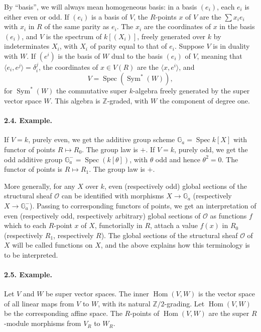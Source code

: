 \documentclass[11pt]{article}
\newcommand{\Z}{\mathbb Z}
\newcommand{\Spec}{\operatorname{Spec}}
\newcommand{\Hom}{\operatorname{Hom}}
\newcommand{\Sym}{\operatorname{Sym}}
\newcommand{\Ga}{\mathbb G_a}
\newcommand{\calO}{\mathcal O}
\begin{document}
By ``basis'', we will always mean homogeneous basis: in a basis $(e_i)$, each $e_i$ is either even or odd. If $(e_i)$ is a basis of $V$, the $R$-points $x$ of $V$ are the $\sum x_i e_i$ with $x_i$ in $R$ of the same parity as $e_i$. The $x_i$ are the coordinates of $x$ in the basis $(e_i)$, and $V$ is the spectrum of $k[(X_i)]$, freely generated over $k$ by indeterminates $X_i$, with $X_i$ of parity equal to that of $e_i$. Suppose $V$ is in duality with $W$. If $(e^i)$ is the basis of $W$ dual to the basis $(e_i)$ of $V$, meaning that $\langle e_i,e^j\rangle=\delta_i^j$, the coordinates of $x\in V(R)$ are the $\langle x,e^i\rangle$, and
\[
V=\Spec(\Sym^*(W)),
\]
for $\Sym^*(W)$ the commutative super $k$-algebra freely generated by the super vector space $W$. This algebra is $\Z$-graded, with $W$ the component of degree one.

\paragraph{2.4. Example.}
If $V=k$, purely even, we get the additive group scheme $\Ga=\Spec k[X]$ with functor of points $R\mapsto R_0$. The group law is $+$. If $V=k$, purely odd, we get the odd additive group $\Ga^- =\Spec(k[\theta])$, with $\theta$ odd and hence $\theta^2=0$. The functor of points is $R\mapsto R_1$. The group law is $+$.

More generally, for any $X$ over $k$, even (respectively odd) global sections of the structural sheaf $\calO$ can be identified with morphisms $X\to\Ga$ (respectively $X\to\Ga^-$). Passing to corresponding functors of points, we get an interpretation of even (respectively odd, respectively arbitrary) global sections of $\calO$ as functions $f$ which to each $R$-point $x$ of $X$, functorially in $R$, attach a value $f(x)$ in $R_0$ (respectively $R_1$, respectively $R$). The global sections of the structural sheaf $\calO$ of $X$ will be called functions on $X$, and the above explains how this terminology is to be interpreted.

\paragraph{2.5. Example.}
Let $V$ and $W$ be super vector spaces. The inner $\Hom(V,W)$ is the vector space of all linear maps from $V$ to $W$, with its natural $\Z/2$-grading. Let $\Hom(V,W)$ be the corresponding affine space. The $R$-points of $\Hom(V,W)$ are the super $R$-module morphisms from $V_R$ to $W_R$.
\end{document}
